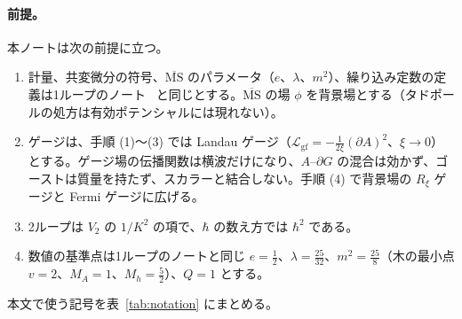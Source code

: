 \documentclass[a4paper,10pt]{ltjsarticle}
\newcommand{\MSbar}{\overline{\mathrm{MS}}}
\begin{document}
\paragraph{前提。}本ノートは次の前提に立つ。
\begin{enumerate}
\item 計量、共変微分の符号、$\MSbar$ のパラメータ（$e$、$\lambda$、$m^2$）、繰り込み定数の定義は1ループのノート~\cite{ahnote} と同じとする。$\MSbar$ の場 $\phi$ を背景場とする（タドポールの処方は有効ポテンシャルには現れない）。
\item ゲージは、手順 (1)〜(3) では Landau ゲージ（$\mathcal L_{\mathrm{gf}}=-\frac1{2\xi}(\partial A)^2$、$\xi\to0$）とする。ゲージ場の伝播関数は横波だけになり、$A$--$\partial G$ の混合は効かず、ゴーストは質量を持たず、スカラーと結合しない。手順 (4) で背景場の $R_\xi$ ゲージと Fermi ゲージに広げる。
\item 2ループは $V_2$ の $1/K^2$ の項で、$\hbar$ の数え方では $\hbar^2$ である。
\item 数値の基準点は1ループのノートと同じ $e=\frac12$、$\lambda=\frac{25}{32}$、$m^2=\frac{25}8$（木の最小点 $v=2$、$M_A=1$、$M_h=\frac52$）、$Q=1$ とする。
\end{enumerate}
本文で使う記号を表~\ref{tab:notation} にまとめる。
\end{document}
